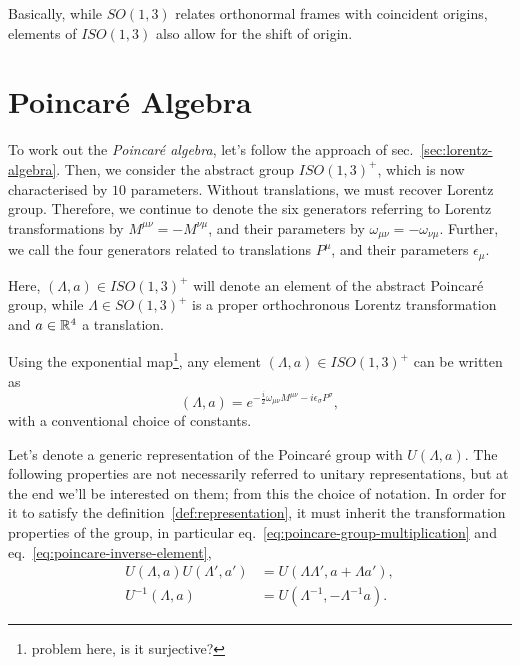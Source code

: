 Basically, while $SO(1,3)$ relates orthonormal frames with coincident origins, elements of $ISO(1,3)$ also allow for the shift of origin.



\section{Poincaré Algebra}
To work out the \emph{Poincaré algebra}, let's follow the approach of sec.~\ref{sec:lorentz-algebra}. Then, we consider the abstract group $ISO(1,3)^+$, which is now characterised by $10$ parameters. Without translations, we must recover Lorentz group. Therefore, we continue to denote the six generators referring to Lorentz transformations by $M^{\mu\nu} = -M^{\nu\mu}$, and their parameters by $\omega_{\mu\nu}=-\omega_{\nu\mu}$. Further, we call the four generators related to translations $P^\mu$, and their parameters $\epsilon_\mu$.

Here, $(\Lambda,a) \in ISO(1,3)^+$ will denote an element of the abstract Poincaré group, while $\Lambda \in SO(1,3)^+$ is a proper orthochronous Lorentz transformation and $a \in \mathbb{R}^4$ a translation.

Using the exponential map\footnote{\color{red}problem here, is it surjective?\color{black}}, any element $(\Lambda,a) \in ISO(1,3)^+$ can be written as
\begin{equation}
    (\Lambda,a) = e^{-\frac{i}{2} \omega_{\mu\nu} M^{\mu\nu} - i \epsilon_\sigma P^\sigma},
\end{equation}
with a conventional choice of constants.

Let's denote a generic representation of the Poincaré group with $U(\Lambda, a)$. The following properties are not necessarily referred to unitary representations, but at the end we'll be interested on them; from this the choice of notation. In order for it to satisfy the definition~\ref{def:representation}, it must inherit the transformation properties of the group, in particular eq.~\eqref{eq:poincare-group-multiplication} and eq.~\eqref{eq:poincare-inverse-element},
\begin{subequations}
\begin{align}
    U(\Lambda, a) U(\Lambda',a') &= U(\Lambda\Lambda', a + \Lambda a') , \label{eq:representation-poincare-group-multiplication} \\
    U^{-1} (\Lambda, a) &= U(\Lambda^{-1},-\Lambda^{-1}a) . \label{eq:representation-poincare-inverse-element}
\end{align}
\end{subequations}

